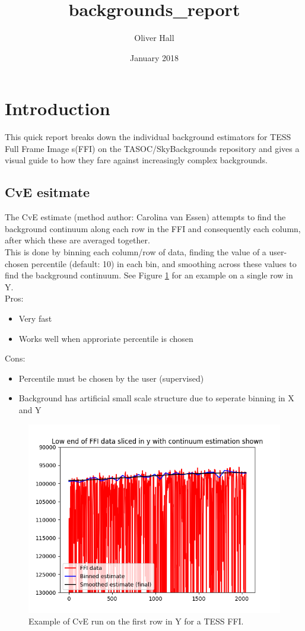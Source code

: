 \documentclass[10pt, a4paper]{article}
\title{backgrounds_report}
\author{Oliver Hall}
\date{January 2018}
\begin{document}
\titlepage

\tableofcontents
\pagebreak

\section{Introduction}
This quick report breaks down the individual background estimators for TESS Full Frame Image s(FFI) on the TASOC/SkyBackgrounds repository and gives a visual guide to how they fare against increasingly complex backgrounds.

\subsection{CvE esitmate}
The CvE estimate (method author: Carolina van Essen) attempts to find the background continuum along each row in the FFI and consequently each column, after which these are averaged together.\\

This is done by binning each column/row of data, finding the value of a user-chosen percentile (default: 10) in each bin, and smoothing across these values to find the background continuum. See Figure \ref{fig:cve} for an example on a single row in Y.\\

Pros:
\begin{itemize}
\item Very fast
\item Works well when approriate percentile is chosen
\end{itemize}

Cons:
\begin{itemize}
\item Percentile must be chosen by the user (supervised)
\item Background has artificial small scale structure due to seperate binning in X and Y
\end{itemize}

\begin{figure}[h!]
\includegraphics[width=\textwidth]{CvE_example}
\caption{Example of CvE run on the first row in Y for a TESS FFI.}
\label{fig:cve}
\end{figure}
\end{document}
